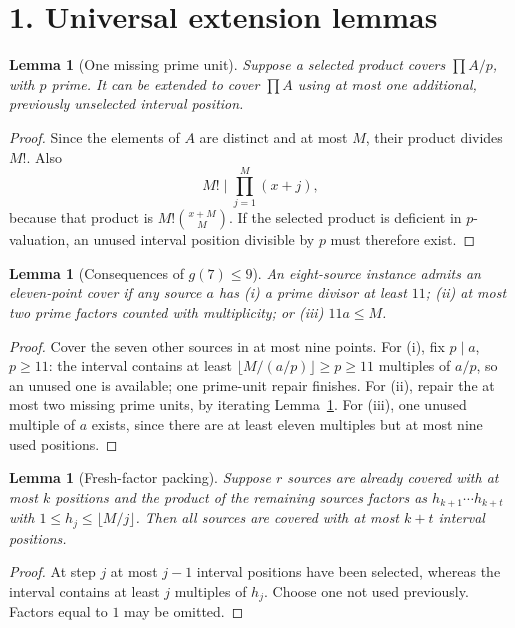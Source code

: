 \documentclass[11pt,a4paper]{article}
\newtheorem{lemma}[theorem]{Lemma}
\begin{document}
\section*{1. Universal extension lemmas}
\begin{lemma}[One missing prime unit]\label{lem:repair}
Suppose a selected product covers $\prod A/p$, with $p$ prime. It can be extended to cover $\prod A$ using at most one additional, previously unselected interval position.
\end{lemma}
\begin{proof}
Since the elements of $A$ are distinct and at most $M$, their product divides $M!$. Also
\[M!\mid\prod_{j=1}^{M}(x+j),\]
because that product is $M!\binom{x+M}{M}$. If the selected product is deficient in $p$-valuation, an unused interval position divisible by $p$ must therefore exist.
\end{proof}
\begin{lemma}[Consequences of $g(7)\le9$]\label{lem:small}
An eight-source instance admits an eleven-point cover if any source $a$ has (i) a prime divisor at least $11$; (ii) at most two prime factors counted with multiplicity; or (iii) $11a\le M$.
\end{lemma}
\begin{proof}
Cover the seven other sources in at most nine points. For (i), fix $p\mid a$, $p\ge11$: the interval contains at least $\lfloor M/(a/p)\rfloor\ge p\ge11$ multiples of $a/p$, so an unused one is available; one prime-unit repair finishes. For (ii), repair the at most two missing prime units, by iterating Lemma~\ref{lem:repair}. For (iii), one unused multiple of $a$ exists, since there are at least eleven multiples but at most nine used positions.
\end{proof}
\begin{lemma}[Fresh-factor packing]\label{lem:bin}
Suppose $r$ sources are already covered with at most $k$ positions and the product of the remaining sources factors as $h_{k+1}\cdots h_{k+t}$ with $1\le h_j\le\lfloor M/j\rfloor$. Then all sources are covered with at most $k+t$ interval positions.
\end{lemma}
\begin{proof}
At step $j$ at most $j-1$ interval positions have been selected, whereas the interval contains at least $j$ multiples of $h_j$. Choose one not used previously. Factors equal to $1$ may be omitted.
\end{proof}
\end{document}
